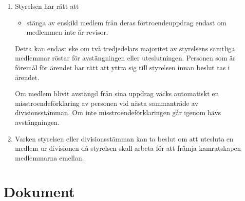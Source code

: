 \documentclass{dvd}
\begin{document}
\begin{enumerate}[label=\arabic* §, ref=\arabic*]
		\item Styrelsen har rätt att

		\begin{itemize}
			\item stänga av enskild medlem från deras förtroendeuppdrag endast om medlemmen inte är revisor.
		\end{itemize}

		Detta kan endast ske om två tredjedelars majoritet av styrelsens samtliga medlemmar röstar för avstängningen eller uteslutningen.
		Personen som är föremål för ärendet har rätt att yttra sig till styrelsen innan beslut tas i ärendet.

		Om medlem blivit avstängd från sina uppdrag väcks automatiskt en misstroendeförklaring av personen vid nästa sammanträde av divisionsstämman.
		Om inte misstroendeförklaringen går igenom hävs avstängningen.

		\item Varken styrelsen eller divisionsstämman kan ta beslut om att utesluta en medlem ur divisionen då styrelsen skall arbeta för att främja kamratskapen medlemmarna emellan.
	\end{enumerate}

	\section{Dokument}
\end{document}

